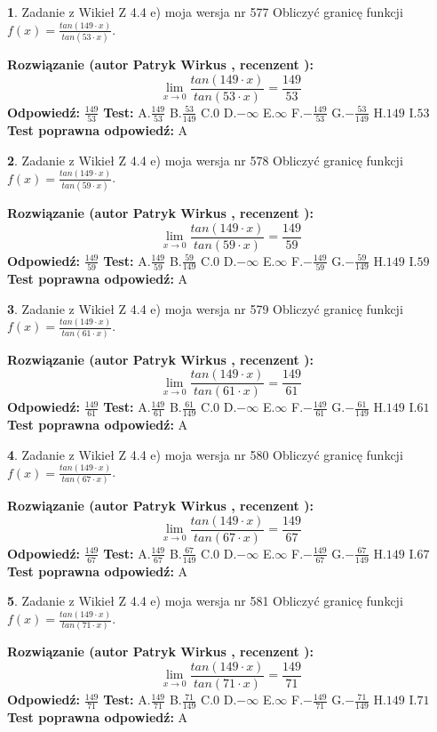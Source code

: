 \documentclass[12pt, a4paper]{article}
\theoremstyle{definition} %
\newtheorem{zad}{}
\newcommand{\zadStart}[1]{\begin{zad}#1\newline}
\newcommand{\zadStop}{\end{zad}}
\newcommand{\rozwStart}[2]{\noindent \textbf{Rozwiązanie (autor #1 , recenzent #2): }\newline}
\newcommand{\rozwStop}{\newline}
\newcommand{\odpStart}{\noindent \textbf{Odpowiedź:}\newline}
\newcommand{\odpStop}{\newline}
\newcommand{\testStart}{\noindent \textbf{Test:}\newline}
\newcommand{\testStop}{\newline}
\newcommand{\kluczStart}{\noindent \textbf{Test poprawna odpowiedź:}\newline}
\newcommand{\kluczStop}{\newline}
\begin{document}
\zadStart{Zadanie z Wikieł Z 4.4 e) moja wersja nr 577}
Obliczyć granicę funkcji $f(x)=\frac{tan(149\cdot x)}{tan(53\cdot x)}$.
\zadStop
\rozwStart{Patryk Wirkus}{}
$$\lim\limits_{x\to 0}\frac{tan(149\cdot x)}{tan(53\cdot x)}=
\frac{149}{53}$$
\rozwStop
\odpStart
$\frac{149}{53}$
\odpStop
\testStart
A.$\frac{149}{53}$
B.$\frac{53}{149}$
C.$0$
D.$-\infty$
E.$\infty$
F.$-\frac{149}{53}$
G.$-\frac{53}{149}$
H.$149$
I.$53$
\testStop
\kluczStart
A
\kluczStop



\zadStart{Zadanie z Wikieł Z 4.4 e) moja wersja nr 578}
Obliczyć granicę funkcji $f(x)=\frac{tan(149\cdot x)}{tan(59\cdot x)}$.
\zadStop
\rozwStart{Patryk Wirkus}{}
$$\lim\limits_{x\to 0}\frac{tan(149\cdot x)}{tan(59\cdot x)}=
\frac{149}{59}$$
\rozwStop
\odpStart
$\frac{149}{59}$
\odpStop
\testStart
A.$\frac{149}{59}$
B.$\frac{59}{149}$
C.$0$
D.$-\infty$
E.$\infty$
F.$-\frac{149}{59}$
G.$-\frac{59}{149}$
H.$149$
I.$59$
\testStop
\kluczStart
A
\kluczStop



\zadStart{Zadanie z Wikieł Z 4.4 e) moja wersja nr 579}
Obliczyć granicę funkcji $f(x)=\frac{tan(149\cdot x)}{tan(61\cdot x)}$.
\zadStop
\rozwStart{Patryk Wirkus}{}
$$\lim\limits_{x\to 0}\frac{tan(149\cdot x)}{tan(61\cdot x)}=
\frac{149}{61}$$
\rozwStop
\odpStart
$\frac{149}{61}$
\odpStop
\testStart
A.$\frac{149}{61}$
B.$\frac{61}{149}$
C.$0$
D.$-\infty$
E.$\infty$
F.$-\frac{149}{61}$
G.$-\frac{61}{149}$
H.$149$
I.$61$
\testStop
\kluczStart
A
\kluczStop



\zadStart{Zadanie z Wikieł Z 4.4 e) moja wersja nr 580}
Obliczyć granicę funkcji $f(x)=\frac{tan(149\cdot x)}{tan(67\cdot x)}$.
\zadStop
\rozwStart{Patryk Wirkus}{}
$$\lim\limits_{x\to 0}\frac{tan(149\cdot x)}{tan(67\cdot x)}=
\frac{149}{67}$$
\rozwStop
\odpStart
$\frac{149}{67}$
\odpStop
\testStart
A.$\frac{149}{67}$
B.$\frac{67}{149}$
C.$0$
D.$-\infty$
E.$\infty$
F.$-\frac{149}{67}$
G.$-\frac{67}{149}$
H.$149$
I.$67$
\testStop
\kluczStart
A
\kluczStop



\zadStart{Zadanie z Wikieł Z 4.4 e) moja wersja nr 581}
Obliczyć granicę funkcji $f(x)=\frac{tan(149\cdot x)}{tan(71\cdot x)}$.
\zadStop
\rozwStart{Patryk Wirkus}{}
$$\lim\limits_{x\to 0}\frac{tan(149\cdot x)}{tan(71\cdot x)}=
\frac{149}{71}$$
\rozwStop
\odpStart
$\frac{149}{71}$
\odpStop
\testStart
A.$\frac{149}{71}$
B.$\frac{71}{149}$
C.$0$
D.$-\infty$
E.$\infty$
F.$-\frac{149}{71}$
G.$-\frac{71}{149}$
H.$149$
I.$71$
\testStop
\kluczStart
A
\kluczStop
\end{document}
